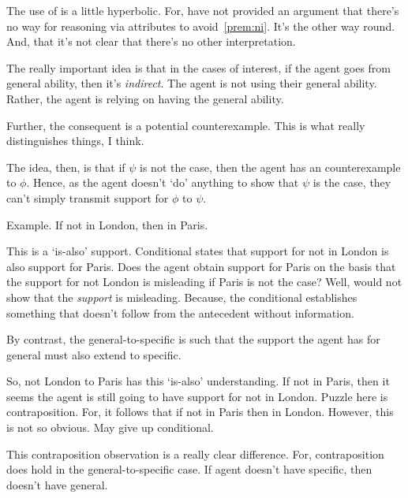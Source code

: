 \begin{note}
  The use of \AR{} is a little hyperbolic.
  For, have not provided an argument that there's no way for reasoning via attributes to avoid~\ref{prem:ni}.
  It's the other way round.
  And, that it's not clear that there's no other interpretation.
\end{note}

\begin{note}[Indirect]
  The really important idea is that in the cases of interest, if the agent goes from general ability, then it's \emph{indirect}.
  The agent is not using their general ability.
  Rather, the agent is relying on having the general ability.

  Further, the consequent is a potential counterexample.
  This is what really distinguishes things, I think.

  The idea, then, is that if \(\psi\) is not the case, then the agent has an counterexample to \(\phi\).
  Hence, as the agent doesn't `do' anything to show that \(\psi\) is the case, they can't simply transmit support for \(\phi\) to \(\psi\).
\end{note}

\begin{note}
  Example.
  If not in London, then in Paris.

  This is a `is-also' support.
  Conditional states that support for not in London is also support for Paris.
  Does the agent obtain support for Paris on the basis that the support for not London is misleading if Paris is not the case?
  Well, would not show that the \emph{support} is misleading.
  Because, the conditional establishes something that doesn't follow from the antecedent without information.

  By contrast, the general-to-specific is such that the support the agent has for general must also extend to specific.

  So, not London to Paris has this `is-also' understanding.
  If not in Paris, then it seems the agent is still going to have support for not in London.
  Puzzle here is contraposition.
  For, it follows that if not in Paris then in London.
  However, this is not so obvious.
  May give up conditional.

  This contraposition observation is a really clear difference.
  For, contraposition does hold in the general-to-specific case.
  If agent doesn't have specific, then doesn't have general.
\end{note}


